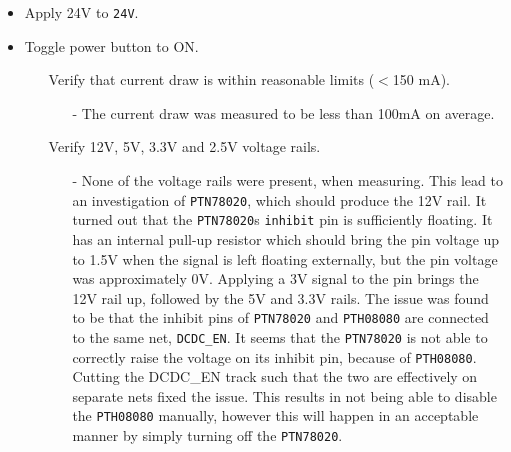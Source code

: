  \begin{itemize}
 	\item Apply 24V to \texttt{24V}.
 	\item Toggle power button to ON.
 	\begin{itemize}
 		\item[\cmark] Verify that current draw is within reasonable limits ($<$150 mA).
 			\begin{itemize}
 				\item[-] The current draw was measured to be less than 100mA on average. 
 			\end{itemize}
 		\item[\xmark] Verify 12V, 5V, 3.3V and 2.5V voltage rails.
 			\begin{itemize}
 				\item[-] None of the voltage rails were present, when measuring.
 				This lead to an investigation of \texttt{PTN78020}, which should produce the 12V rail. 
 				It turned out that the \texttt{PTN78020}s \texttt{inhibit} pin is sufficiently floating.
 				It has an internal pull-up resistor which should bring the pin voltage up to 1.5V when the signal is left floating externally, but the pin voltage was approximately 0V.
 				Applying a 3V signal to the pin brings the 12V rail up, followed by the 5V and 3.3V rails.
 				The issue was found to be that the inhibit pins of \texttt{PTN78020} and \texttt{PTH08080} are connected to the same net, \texttt{DCDC\_EN}.
 				It seems that the \texttt{PTN78020} is not able to correctly raise the voltage on its inhibit pin, because of \texttt{PTH08080}. 
 				Cutting the DCDC\_EN track such that the two are effectively on separate nets fixed the issue.
            	This results in not being able to disable the \texttt{PTH08080} manually, however this will happen in an acceptable manner by simply turning off the \texttt{PTN78020}.
 			\end{itemize}
 	\end{itemize}
 \end{itemize}
